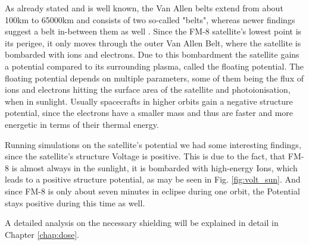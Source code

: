 As already stated and is well known, the Van Allen belts extend from about 100km to 65000km and consists of two so-called "belts", whereas newer findings suggest a belt in-between them as well \citep{ecss:10-04C}. Since the FM-8 satellite's lowest point is its perigee, it only moves through the outer Van Allen Belt, where the satellite is bombarded with ions and electrons. 
Due to this bombardment the satellite gains a potential compared to its surrounding plasma, called the floating potential. The floating potential depends on multiple parameters, some of them being the flux of ions and electrons hitting the surface area of the satellite and photoionisation, when in sunlight.
Usually spacecrafts in higher orbits gain a negative structure potential, since the electrons have a smaller mass and thus are faster and more energetic in terms of their thermal energy.

Running simulations on the satellite's potential we had some interesting findings, since the satellite's structure Voltage is positive. This is due to the fact, that FM-8 is almost always in the sunlight, it is bombarded with high-energy Ions, which leads to a positive structure potential, as may be seen in Fig. \ref{fig:volt_sun}. And since FM-8 is only about seven minutes in eclipse during one orbit, the Potential stays positive during this time as well.




A detailed analysis on the necessary shielding will be explained in detail in Chapter \ref{chap:dose}.


